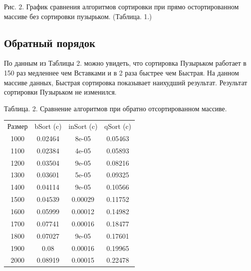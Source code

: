 \documentclass[12pt]{report}
\begin{document}
		\begin{center}
			\begin{center}
			\end{center}
			Рис. 2. График сравнения алгоритмов сортировки при прямо остортированном массиве без сортировки пузырьком. (Таблица. 1.)
		\end{center}

\subsection{Обратный порядок}

По данным из Таблицы 2. можно увидеть, что сортировка Пузырьком работает в 150 раз медленнее чем Вставками и в 2 раза быстрее чем Быстрая.
На данном массиве данных, Быстрая сортировка показывает наихудший результат.
Результат сортировки Пузырьком не изменился.

\begin{center}
	Таблица. 2. Сравнение алгоритмов при обратно отсортированном массиве.
	\begin{tabular}{|c c c c|}
		\hline
		Размер & bSort (c) & inSort (c) & qSort (c) \\ [0.5ex]
		1000 & 0.02464 & 8e-05 & 0.05463 \\ 
		\hline 
		1100 & 0.02384 & 4e-05 & 0.05893 \\ 
		\hline 
		1200 & 0.03504 & 9e-05 & 0.08216 \\ 
		\hline 
		1300 & 0.03601 & 5e-05 & 0.09325 \\ 
		\hline 
		1400 & 0.04114 & 9e-05 & 0.10566 \\ 
		\hline 
		1500 & 0.04539 & 0.00029 & 0.11752 \\ 
		\hline 
		1600 & 0.05999 & 0.00012 & 0.14982 \\ 
		\hline 
		1700 & 0.07741 & 0.00016 & 0.18477 \\ 
		\hline 
		1800 & 0.07027 & 9e-05 & 0.17601 \\ 
		\hline 
		1900 & 0.08 & 0.00016 & 0.19965 \\ 
		\hline 
		2000 & 0.08919 & 0.00015 & 0.22478 \\ 
		\hline 
	\end{tabular}
\end{center}
\end{document}
